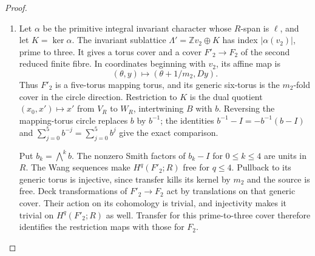 \begin{proof}
\begin{enumerate}[label={$\langle1\rangle$\arabic*.}]
The base-orbifold quotient in \cref{maps:src:F.2.7} shows that
$\gcd(m_1,m_2)=1$.  In particular $m_1$ is a unit in $R$.
The homology augmentation matrix $[A^t-I\mid B^t-I]$ has first
row zero and rank-five minors $-4$ and $-1$ in its last five
rows, respectively.  Its coinvariant quotient over $R$ is
therefore $R$ through $\ell(x)=x_0$.  With $a_i=\ell(v_i)$,
the finite power relations and cusp clutch give the quotient
relation matrix
\[
 \begin{pmatrix}m_1&0&-a_1\\0&m_2&-a_2\\1&1&-\delta\end{pmatrix}.
\]
Here $\delta$ is the character value of the cusp clutch.
The character annihilates the collapsed angular cycles, so these
maps on the finite caps and cusp agree on the boundary and define
a quotient of the abelianized fundamental group.  Simple
connectivity makes its determinant a unit.  Reduction modulo
three forces $a_2$ to be a unit.  Arbitrary clutch translations
are included in $\delta$.

\item Let $\alpha$ be the primitive integral invariant character
whose $R$-span is $\ell$, and let $K=\ker\alpha$.  The invariant
sublattice $\Lambda'=\mathbb Zv_2\oplus K$ has index
$|\alpha(v_2)|$, prime to three.  It gives a torus cover
and a cover $F'_2\to F_2$ of the second reduced finite
fibre.  In coordinates beginning with $v_2$, its affine map is
\[
 (\theta,y)\longmapsto(\theta+1/m_2,Dy).
\]
Thus $F'_2$ is a five-torus mapping torus, and its generic
six-torus is the $m_2$-fold cover in the circle direction.
Restriction to $K$ is the dual quotient
$(x_0,x')\mapsto x'$ from $V_R$ to $W_R$, intertwining $B$ with $b$.
Reversing the mapping-torus circle replaces $b$ by $b^{-1}$;
the identities $b^{-1}-I=-b^{-1}(b-I)$ and
$\sum_{j=0}^5b^{-j}=\sum_{j=0}^5b^j$ give the exact comparison.

Put $b_k=\bigwedge^kb$.  The nonzero Smith factors of $b_k-I$
for $0\leq k\leq4$ are units in $R$.  The Wang sequences make
$H^q(F'_2;R)$ free for $q\leq4$.  Pullback to its generic torus
is injective, since transfer kills its kernel by $m_2$ and the
source is free.  Deck transformations of $F'_2\to F_2$ act by
translations on that generic cover.  Their action on its
cohomology is trivial, and injectivity makes it trivial on
$H^q(F'_2;R)$ as well.  Transfer for this prime-to-three cover
therefore identifies the restriction maps with those for $F_2$.


\end{enumerate}
\end{proof}
